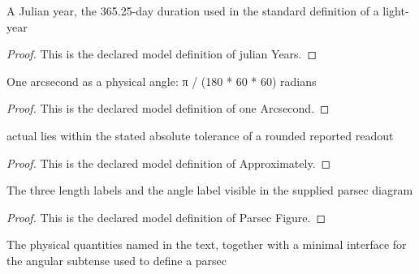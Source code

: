 \begin{definition}
  \label{def:physics:phyx-mini-0727:phyxminiproblems-problemphyxmini0727-julianyears}
  A Julian year, the 365.25-day duration used in the standard definition of a light-year
\end{definition}
\begin{proof}
  This is the declared model definition of julian Years.
\end{proof}
\begin{definition}
  \label{def:physics:phyx-mini-0727:phyxminiproblems-problemphyxmini0727-onearcsecond}
  One arcsecond as a physical angle: π / (180 * 60 * 60) radians
\end{definition}
\begin{proof}
  This is the declared model definition of one Arcsecond.
\end{proof}
\begin{definition}[Approximately]
  \label{def:physics:phyx-mini-0727:phyxminiproblems-problemphyxmini0727-approximately}
  actual lies within the stated absolute tolerance of a rounded reported readout
\end{definition}
\begin{proof}
  This is the declared model definition of Approximately.
\end{proof}
\begin{definition}
  \label{def:physics:phyx-mini-0727:phyxminiproblems-problemphyxmini0727-parsecfigure}
  The three length labels and the angle label visible in the supplied parsec diagram
\end{definition}
\begin{proof}
  This is the declared model definition of Parsec Figure.
\end{proof}
\begin{definition}
  \label{def:physics:phyx-mini-0727:phyxminiproblems-problemphyxmini0727-astronomicaldistancesetup}
  The physical quantities named in the text, together with a minimal interface for the angular subtense used to define a parsec
\end{definition}
